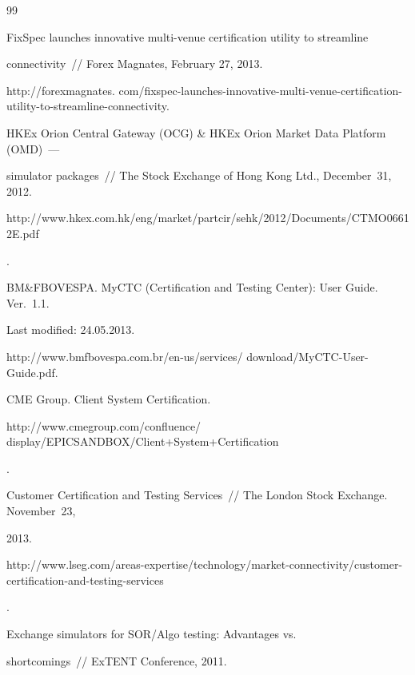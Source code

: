 {{\begin{thebibliography}{99}


 FixSpec launches innovative multi-venue certification utility to streamline


connectivity~/\!\!/ Forex Magnates, February 27, 2013.


{\sf http://forexmagnates. com/fixspec-launches-innovative-multi-venue-certification-utility-to-streamline-connectivity}.







HKEx Orion Central Gateway (OCG) \& HKEx Orion Market Data Platform (OMD)~---


simulator packages~/\!\!/ The Stock Exchange of Hong Kong Ltd., December~31, 2012. {\sf


http://www.hkex.com.hk/eng/market/partcir/sehk/2012/\linebreak Documents/CTMO06612E.pdf}.







 BM\&FBOVESPA. MyCTC (Certification and Testing Center): User Guide. Ver.~1.1.


 Last modified: 24.05.2013.


{\sf http://www.bmfbovespa.com.br/en-us/services/ download/MyCTC-User-Guide.pdf}.







CME Group. Client System Certification. {\sf


http://www.cmegroup.com/confluence/ display/EPICSANDBOX/Client+System+Certification}.







Customer Certification and Testing Services~/\!\!/ The London Stock Exchange. November~23,


2013. {\sf


http://www.lseg.com/areas-expertise/technology/market-connectivity/customer-certification-and-testing-services}.







 Exchange simulators for SOR/Algo testing: Advantages vs.\


shortcomings~/\!\!/ ExTENT Conference, 2011.



\end{thebibliography}}}
